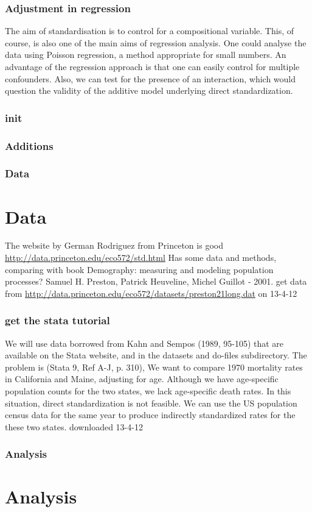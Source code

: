 \documentclass[a4paper]{beamer}
\begin{document}
\begin{frame}
\frametitle{Adjustment in regression}
\label{sec-5}

The aim of standardisation is to control for a compositional variable. This, of course, is also one of the main aims of regression analysis. One could analyse the data using Poisson regression, a method appropriate for small numbers. An advantage of the regression approach is that one can easily control for multiple confounders. Also, we can test for the presence of an interaction, which would question the validity of the additive model underlying direct standardization. 
\end{frame}
\begin{frame}
\frametitle{init}
\label{sec-6}
\end{frame}
\begin{frame}
\frametitle{Additions}
\label{sec-7}
\end{frame}
\begin{frame}
\frametitle{Data}
\label{sec-8}

\section{Data}
The website by German Rodriguez from Princeton is good \href{http://data.princeton.edu/eco572/std.html}{http://data.princeton.edu/eco572/std.html}
Has some data and methods, comparing with book Demography: measuring and modeling population processes? Samuel H. Preston, Patrick Heuveline, Michel Guillot - 2001.
get data from \href{http://data.princeton.edu/eco572/datasets/preston21long.dat}{http://data.princeton.edu/eco572/datasets/preston21long.dat}
on 13-4-12
\end{frame}
\begin{frame}
\frametitle{get the stata tutorial}
\label{sec-9}

We will use data borrowed from Kahn and Sempos (1989, 95-105) that are available on the Stata website, and in the datasets and do-files subdirectory.  The problem is (Stata 9, Ref A-J, p. 310), We want to compare 1970 mortality rates in California and Maine, adjusting for age.  Although we have age-specific population counts for the two states, we lack age-specific death rates.  In this situation, direct standardization is not feasible.  We can use the US population census data for the same year to produce indirectly standardized rates for the these two states.       
downloaded 13-4-12
\end{frame}
\begin{frame}
\frametitle{Analysis}
\label{sec-10}

\section{Analysis}
\end{frame}
\end{document}
